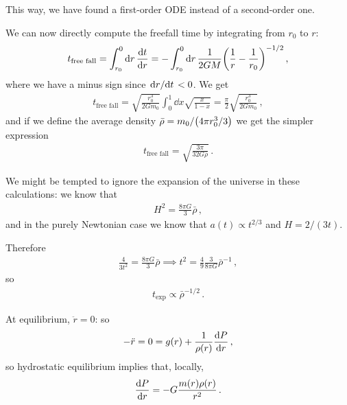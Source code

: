 \documentclass[main.tex]{subfiles}
\begin{document}
This way, we have found a first-order ODE instead of a second-order one.

We can now directly compute the freefall time by integrating from \(r_0 \) to \(r\):
%
\begin{align}
  t _{\text{free fall}} =  \int_{r_0 }^{0} \dd{r} \dv{t}{r}
  = - \int_{r_0 }^{0} \dd{r} \frac{1}{2GM}\qty(\frac{1}{r} - \frac{1}{r_0 })^{-1/2}
\,,
\end{align}
%
where we have a minus sign since \(\dv*{r}{t}<0\). We get 
%
\begin{align}
  t _{\text{free fall}} = \sqrt{\frac{r_0^3}{2 G m_0 }} \int_{0}^{1} \dd{x} \sqrt{\frac{x}{1-x}}
  = \frac{\pi}{2} \sqrt{\frac{r_0^3}{2 G m_0 }}
\,,
\end{align}
%
and if we define the average density \(\bar{\rho} = m_0 / \qty(4 \pi r_0^3 / 3)\) we get the simpler expression 
%
\begin{align}
  t _{\text{free fall}} = \sqrt{\frac{3 \pi }{32 G \bar{\rho} }}
\,.
\end{align}

We might be tempted to ignore the expansion of the universe in these calculations: we know that 
%
\begin{align}
  H^2 = \frac{8 \pi G}{3} \bar{\rho}
\,,
\end{align}
%
and in the purely Newtonian case we know that \(a(t) \propto t^{2/3}\) and \(H = 2/(3t)\). 

Therefore 
%
\begin{align}
  \frac{4}{3 t^2} = \frac{8 \pi G}{3} \bar{\rho} 
  \implies 
  t^2 = \frac{4}{9} \frac{3}{8 \pi G} \bar{\rho}^{-1}
\,,
\end{align}
%
so 
%
\begin{align}
  t _{\text{exp}} \propto \bar{\rho}^{- 1/2}
\,. 
\end{align}


At equilibrium, \(\ddot{r} = 0\): so 
%
\begin{align}
  - \ddot{r} = 0 = g(r) + \frac{1}{\rho (r)} \dv{P}{r}
\,,
\end{align}
%
so hydrostatic equilibrium implies that, locally, 
%
\begin{align}
  \dv{P}{r} = - G \frac{m(r) \rho (r)}{r^2}
\,.
\end{align}
%
\end{document}
